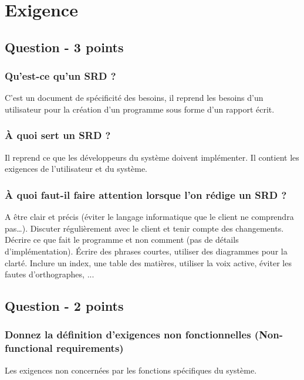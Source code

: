 \section{Exigence}



\subsection{Question - 3 points}



\subsubsection{Qu'est-ce qu'un SRD ?}
\textcolor[rgb]{0,0.48,0.58}{C'est un document de spécificité des besoins, il reprend les besoins d'un utilisateur pour la création d'un programme sous forme d'un rapport écrit.}



\subsubsection{À quoi sert un SRD ?}
\textcolor[rgb]{0,0.48,0.58}{Il reprend ce que les développeurs du système doivent implémenter. Il contient les exigences de l'utilisateur et du système.}



\subsubsection{À quoi faut-il faire attention lorsque l'on rédige un SRD ?}
\textcolor[rgb]{0,0.48,0.58}{A être clair et précis (éviter le langage informatique que le client ne comprendra pas…). Discuter régulièrement avec le client et tenir compte des changements. Décrire ce que fait le programme et non comment (pas de détails d'implémentation). Écrire des phrases courtes, utiliser des diagrammes pour la clarté. Inclure un index, une table des matières, utiliser la voix active, éviter les fautes d'orthographes, ...}



\subsection{Question - 2 points}



\subsubsection{Donnez la définition d’exigences non fonctionnelles (Non-functional requirements)}
\textcolor[rgb]{0,0.48,0.58}{Les exigences non concernées par les fonctions spécifiques du système.}

